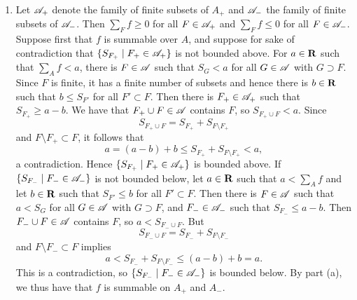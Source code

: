 \begin{prob}
\begin{enumerate}
\item Let $\mathscr{A}_+$ denote the family of finite subsets of $A_+$ and $\mathscr{A}_-$ the family of finite subsets of $\mathscr{A}_-$. Then $\sum_Ff \geq 0$ for all $F \in \mathscr{A}_+$ and $\sum_Ff \leq 0$ for all $F \in \mathscr{A}_-$. Suppose first that $f$ is summable over $A$, and suppose for sake of contradiction that $\{S_{F_+}\mid F_+ \in \mathscr{A}_+\}$ is not bounded above. For $a \in \mathbf{R}$ such that $\sum_Af < a$, there is $F \in \mathscr{A}$ such that $S_G < a$ for all $G \in \mathscr{A}$ with $G \supset F$. Since $F$ is finite, it has a finite number of subsets and hence there is $b \in \mathbf{R}$ such that $b \leq S_{F'}$ for all $F' \subset F$. Then there is $F_+ \in \mathscr{A}_+$ such that $S_{F_+} \geq a - b$. We have that $F_+\cup F \in \mathscr{A}$ contains $F$, so $S_{F_+\cup F} < a$. Since \[S_{F_+\cup F} = S_{F_+} + S_{F\setminus F_+}\] and $F\setminus F_+ \subset F$, it follows that \[a = (a - b) + b \leq S_{F_+} + S_{F\setminus F_+} < a,\] a contradiction. Hence $\{S_{F_+}\mid F_+ \in \mathscr{A}_+\}$ is bounded above. If $\{S_{F_-}\mid F_- \in \mathscr{A}_-\}$ is not bounded below, let $a \in \mathbf{R}$ such that $a < \sum_Af$ and let $b \in \mathbf{R}$ such that $S_{F'} \leq b$ for all $F' \subset F$. Then there is $F \in \mathscr{A}$ such that $a < S_G$ for all $G \in \mathscr{A}$ with $G \supset F$, and $F_- \in \mathscr{A}_-$ such that $S_{F_-} \leq a-b$. Then $F_-\cup F \in \mathscr{A}$ contains $F$, so $a < S_{F_-\cup F}$. But \[S_{F_-\cup F} = S_{F_-} + S_{F\setminus F_-}\] and $F\setminus F_- \subset F$ implies \[a < S_{F_-} + S_{F\setminus F_-} \leq (a - b) + b = a.\] This is a contradiction, so $\{S_{F_-} \mid F_- \in \mathscr{A}_-\}$ is bounded below. By part (a), we thus have that $f$ is summable on $A_+$ and $A_-$.


\end{enumerate}
\end{prob}
